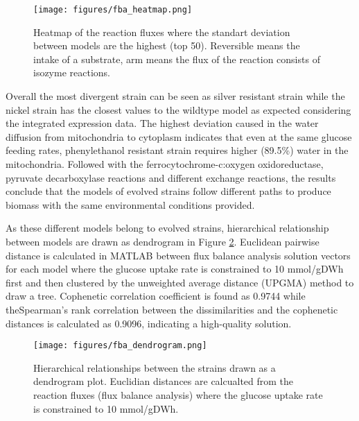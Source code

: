 \begin{figure}[H]
  \begin{center}
  \texttt{[image: figures/fba\_heatmap.png]}
  \caption[Heatmap of the reaction fluxes where the standart deviation between models are the highest (top 50). Reversible means the intake of a substrate, arm means the flux of the reaction consists of isozyme reactions]{Heatmap of the reaction fluxes where the standart deviation between models are the highest (top 50). Reversible means the intake of a substrate, arm means the flux of the reaction consists of isozyme reactions.}
  \label{fig:fba_heatmap}
  \end{center}
\end{figure}

Overall the most divergent strain can be seen as silver resistant strain while the nickel strain has the closest values to the wildtype model as expected considering the integrated expression data. The highest deviation caused in the water diffusion from mitochondria to cytoplasm indicates that even at the same glucose feeding rates, phenylethanol resistant strain requires higher (89.5\%) water in the mitochondria. Followed with the ferrocytochrome-c:oxygen oxidoreductase, pyruvate decarboxylase reactions and different exchange reactions, the results conclude that the models of evolved strains follow different paths to produce biomass with the same environmental conditions provided.

As these different models belong to evolved strains, hierarchical relationship between models are drawn as dendrogram in Figure \ref{fig:fba_dendrogram}. Euclidean pairwise distance is calculated in MATLAB between flux balance analysis solution vectors for each model where the glucose uptake rate is constrained to 10 mmol/gDWh first and then clustered by the unweighted average distance (UPGMA) method to draw a tree. Cophenetic correlation coefficient is found as 0.9744 while theSpearman's rank correlation between the dissimilarities and the cophenetic distances is calculated as 0.9096, indicating a high-quality solution.

\begin{figure}[H]
  \begin{center}
  \texttt{[image: figures/fba\_dendrogram.png]}
  \caption[Hierarchical relationships between the strains drawn as a dendrogram plot. Euclidian distances are calcualted from the reaction fluxes (flux balance analysis) where the glucose uptake rate is constrained to 10 mmol/gDWh]{Hierarchical relationships between the strains drawn as a dendrogram plot. Euclidian distances are calcualted from the reaction fluxes (flux balance analysis) where the glucose uptake rate is constrained to 10 mmol/gDWh.}
  \label{fig:fba_dendrogram}
  \end{center}
\end{figure}

